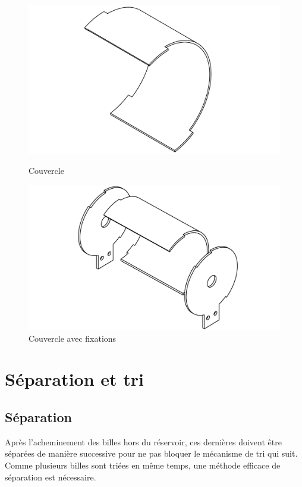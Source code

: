 \begin{figure}
    \begin{minipage}[c]{0.45\linewidth}
        \centerfloat
        \includegraphics[width=1.7\linewidth]{Graphics/Roue/DRAWING_COUVERCLE.pdf}
        \caption{Couvercle}
    \end{minipage}
    \hfill
    \begin{minipage}[c]{0.45\linewidth}
        \centerfloat
        \includegraphics[width=1.7\linewidth]{Graphics/Roue/DRAWING_COUVERCLE_DEMI_COMPLET.pdf}
        \caption{Couvercle avec fixations}
    \end{minipage}
\end{figure}

\section{Séparation et tri}

\subsection{Séparation}
Après l'acheminement des billes hors du réservoir, ces dernières doivent être séparées de manière successive pour ne pas bloquer le mécanisme de tri qui suit. Comme plusieurs billes sont triées en même temps, une méthode efficace de séparation est nécessaire. 

